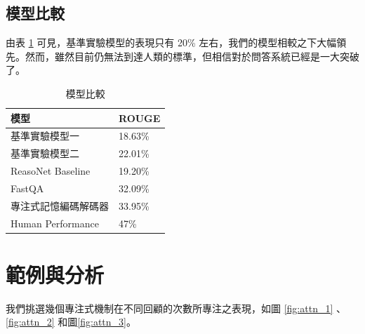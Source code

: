 \subsection{模型比較}
由表 \ref{table:model} 可見，基準實驗模型的表現只有 20\% 左右，我們的模型相較之下大幅領先。然而，雖然目前仍無法到達人類的標準，但相信對於問答系統已經是一大突破了。
\begin{table}
    \caption{模型比較}
    \label{table:model}
    \centering
    \begin{tabular}{|l|l|}
        \hline
        模型 & ROUGE\\
        \hline
        基準實驗模型一 & 18.63\% \\
        \hline
        基準實驗模型二 & 22.01\% \\%
        \hline
        ReasoNet Baseline \cite{shen2016reasonet}& 19.20\% \\
        \hline
        FastQA \cite{weissenborn2017making} &32.09\% \\
        \hline
        專注式記憶編碼解碼器 &  33.95\% \\ %
        \hline
        Human Performance &47\% \\ %
        \hline
    \end{tabular}
\end{table}
\section{範例與分析}
我們挑選幾個專注式機制在不同回顧的次數所專注之表現，如圖 \ref{fig:attn_1} 、 \ref{fig:attn_2} 和圖\ref{fig:attn_3}。

